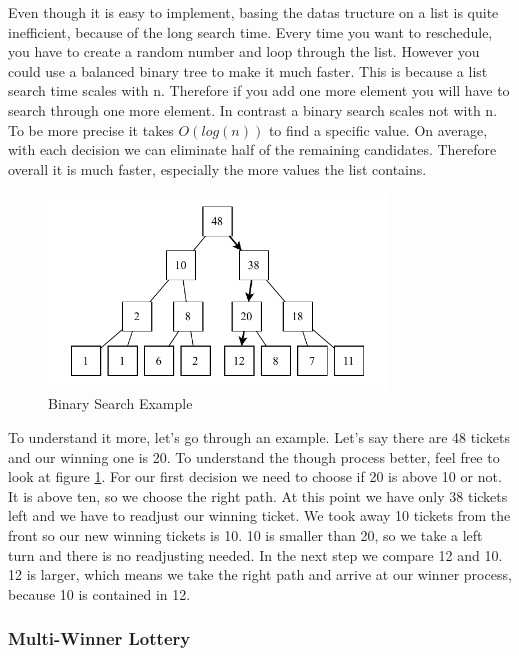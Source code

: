 Even though it is easy to implement, basing the datas tructure on a list is quite inefficient, because of the long search time.
Every time you want to reschedule, you have to create a random number and loop through the list.
However you could use a balanced binary tree to make it much faster.
This is because a list search time scales with n. 
Therefore if you add one more element you will have to search through one more element.
In contrast a binary search scales not with n.
To be more precise it takes $O(log(n))$ to find a specific value.
On average, with each decision we can eliminate half of the remaining candidates.
Therefore overall it is much faster, especially the more values the list contains.

\begin{figure}[h]
    \centering
    \includegraphics[width=0.8\textwidth]{Assets/Binary-Search.pdf}
    \caption{Binary Search Example}
    \label{fig:binary-search}
\end{figure}

To understand it more, let's go through an example. Let's say there are 48 tickets and our winning one is 20.
To understand the though process better, feel free to look at figure \ref{fig:binary-search}.
For our first decision we need to choose if 20 is above 10 or not.
It is above ten, so we choose the right path.
At this point we have only 38 tickets left and we have to readjust our winning ticket.
We took away 10 tickets from the front so our new winning tickets is 10.
10 is smaller than 20, so we take a left turn and there is no readjusting needed.
In the next step we compare 12 and 10.
12 is larger, which means we take the right path and arrive at our winner process, because 10 is contained in 12.

\subsubsection{Multi-Winner Lottery}

